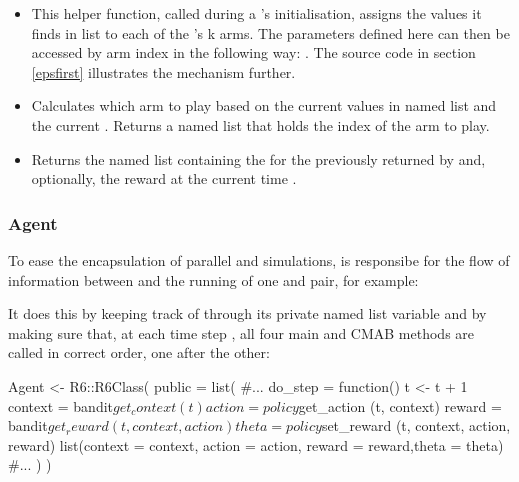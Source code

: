 \documentclass{jss}
\begin{document}
\begin{itemize}

\item{}{
 This helper function, called during a 's initialisation, assigns the values
 it finds in list  to each of the 's k arms.
 The parameters defined here can then be accessed by arm index in the following way:
 . The source code in section \ref{epsfirst}
 illustrates the mechanism further.
}

\item{}{
 Calculates which arm to play based on the current values in named list 
 and the current . Returns a named list
  that holds the index of the arm
 to play.
}

\item{}{
 Returns the named list
  containing the 
 for the  previously returned by  and, optionally, the  reward
 at the current time .
 }
\end{itemize}

\subsubsection{Agent}

To ease the encapsulation of parallel  and  simulations,  is responsibe for the flow of information between and the running of one  and  pair, for example:


It does this by keeping track of   through its private named list variable  and by making sure that, at each time step , all four main  and  CMAB methods are called in correct order, one after the other:

\begin{Code}
Agent <- R6::R6Class(
  public = list(
    #...
    do_step = function() {
      t <- t + 1
      context = bandit$get_context(t)
      action  = policy$get_action (t, context)
      reward  = bandit$get_reward (t, context, action)
      theta   = policy$set_reward (t, context, action, reward)
      list(context = context, action = action, reward = reward,theta = theta)
    }
    #...
  )
)
\end{Code}
\end{document}
